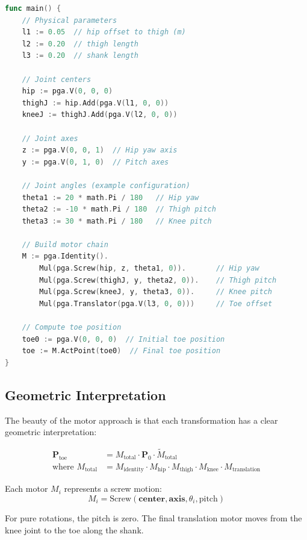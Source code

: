 \documentclass[11pt]{article}
\begin{document}
\begin{lstlisting}[language=Go, caption=Forward kinematics implementation in Go]
func main() {
    // Physical parameters
    l1 := 0.05  // hip offset to thigh (m)
    l2 := 0.20  // thigh length  
    l3 := 0.20  // shank length

    // Joint centers
    hip := pga.V(0, 0, 0)
    thighJ := hip.Add(pga.V(l1, 0, 0))
    kneeJ := thighJ.Add(pga.V(l2, 0, 0))

    // Joint axes
    z := pga.V(0, 0, 1)  // Hip yaw axis
    y := pga.V(0, 1, 0)  // Pitch axes

    // Joint angles (example configuration)
    theta1 := 20 * math.Pi / 180   // Hip yaw
    theta2 := -10 * math.Pi / 180  // Thigh pitch  
    theta3 := 30 * math.Pi / 180   // Knee pitch

    // Build motor chain
    M := pga.Identity().
        Mul(pga.Screw(hip, z, theta1, 0)).       // Hip yaw
        Mul(pga.Screw(thighJ, y, theta2, 0)).    // Thigh pitch
        Mul(pga.Screw(kneeJ, y, theta3, 0)).     // Knee pitch  
        Mul(pga.Translator(pga.V(l3, 0, 0)))     // Toe offset

    // Compute toe position
    toe0 := pga.V(0, 0, 0)  // Initial toe position
    toe := M.ActPoint(toe0)  // Final toe position
}
\end{lstlisting}

\subsection{Geometric Interpretation}

The beauty of the motor approach is that each transformation has a clear geometric interpretation:

\begin{align}
\mathbf{P}_{\text{toe}} &= M_{\text{total}} \cdot \mathbf{P}_0 \cdot \tilde{M}_{\text{total}}\\
\text{where } M_{\text{total}} &= M_{\text{identity}} \cdot M_{\text{hip}} \cdot M_{\text{thigh}} \cdot M_{\text{knee}} \cdot M_{\text{translation}}
\end{align}

Each motor $M_i$ represents a screw motion:
\[M_i = \text{Screw}(\mathbf{center}, \mathbf{axis}, \theta_i, \text{pitch})\]

For pure rotations, the pitch is zero. The final translation motor moves from the knee joint to the toe along the shank.
\end{document}
